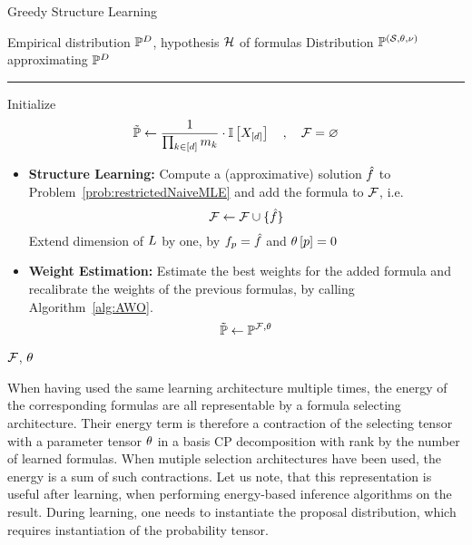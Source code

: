 \begin{algorithm}[hbt!]
    \caption{Greedy Structure Learning}\label{alg:greedyStructureLearning}
    \begin{algorithmic}
        \Require Empirical distribution $\mathbb{P}^{D}$, hypothesis $\mathcal{H}$ of formulas
        \Ensure Distribution $\mathbb{P}^{(\mathcal{S},\theta,\nu)}$ approximating $\mathbb{P}^{D}$
        \hrule
        \State Initialize
        \[ \tilde{\mathbb{P}} \leftarrow \frac{1}{\prod_{k\in[d]}m_{k}} \cdot \mathbb{I}\left[X_{[d]}\right] \quad, \quad \mathcal{F} = \varnothing \]
            \State
            \begin{itemize}
                \item \textbf{Structure Learning:} Compute a (approximative) solution $\hat{f}$ to Problem~\ref{prob:restrictedNaiveMLE} and add the formula to $\mathcal{F}$, i.e.
                \[ \mathcal{F} \leftarrow \mathcal{F} \cup\{\hat{f}\} \]
                Extend dimension of $L$ by one, by $f_{p}=\hat{f}$ and $\theta\left[p\right]=0$
                \item \textbf{Weight Estimation:} Estimate the best weights for the added formula and recalibrate the weights of the previous formulas, by calling Algorithm~\ref{alg:AWO}.
                \[ \tilde{\mathbb{P}} \leftarrow \mathbb{P}^{\mathcal{F}, \theta} \]
            \end{itemize}
        \EndWhile
        \State \Return $\mathcal{F}$, $\theta$ %
    \end{algorithmic}
\end{algorithm}


When having used the same learning architecture multiple times, the energy of the corresponding formulas are all representable by a formula selecting architecture.
Their energy term is therefore a contraction of the selecting tensor with a parameter tensor $\theta$ in a basis CP decomposition with rank by the number of learned formulas.
When mutiple selection architectures have been used, the energy is a sum of such contractions.
% 
Let us note, that this representation is useful after learning, when performing energy-based inference algorithms on the result.
During learning, one needs to instantiate the proposal distribution, which requires instantiation of the probability tensor.


